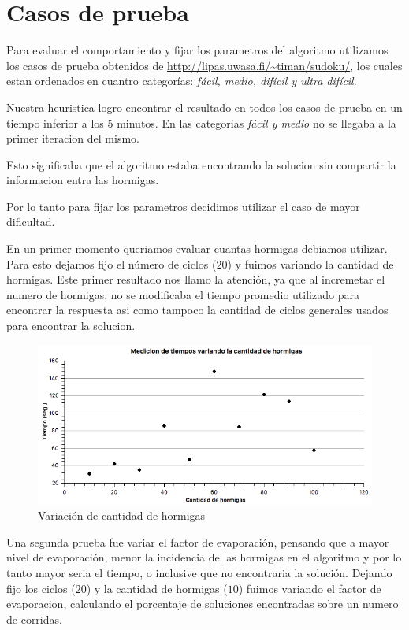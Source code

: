\section{Casos de prueba}
\label{sec:intro}

Para evaluar el comportamiento y fijar los parametros del algoritmo utilizamos los casos de prueba obtenidos de
\url{http://lipas.uwasa.fi/~timan/sudoku/}, los cuales estan ordenados en cuantro categorías: \textit{fácil, medio, difícil y ultra difícil}.

Nuestra heuristica logro encontrar el resultado en todos los casos de prueba en 
un tiempo inferior a los 5 minutos. En las categorias  \textit{fácil y medio} no 
se llegaba a la primer iteracion del mismo.

Esto significaba que el algoritmo estaba encontrando la solucion sin compartir 
la informacion entra las hormigas. 

Por lo tanto para fijar los parametros decidimos utilizar el caso de mayor dificultad. 

En un primer momento queriamos evaluar cuantas hormigas debiamos utilizar. 
Para esto dejamos fijo el número de ciclos ($20$) y fuimos variando la cantidad de hormigas. 
Este primer resultado nos llamo la atención, ya que al incremetar el numero de hormigas, no se modificaba el tiempo 
promedio utilizado para encontrar la respuesta asi como tampoco la cantidad de 
ciclos generales usados para encontrar la solucion. 

\begin{figure}[h]
	\centering
	\includegraphics[scale=0.55]{./graficos/variacion_hormigas.png}
	\caption{Variación de cantidad de hormigas}
	\label{img:time_ants}
\end{figure}


Una segunda prueba fue variar el factor de evaporación, pensando que a mayor nivel de evaporación, 
menor la incidencia de las hormigas en el algoritmo y por lo tanto mayor seria el tiempo, o inclusive que no 
encontraria la solución.
Dejando fijo los ciclos ($20$) y la cantidad de hormigas ($10$) fuimos variando el factor de 
evaporacion, calculando el porcentaje de soluciones encontradas sobre un numero de corridas.  

